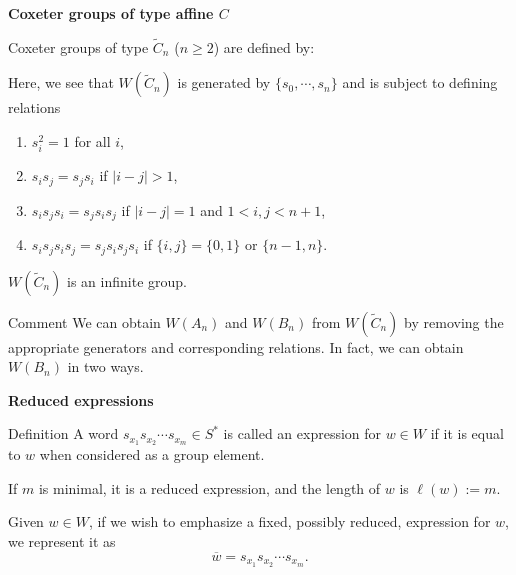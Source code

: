 \documentclass[9pt,handout]{beamer}
\newcommand{\w}{\overline{w}}
\newcommand{\C}{\widetilde{C}}
\begin{document}
\begin{frame}{\textbf{Coxeter groups of type affine $C$}}

Coxeter groups of type $\C_{n}$ ($n \geq 2$) are defined by:
\begin{figure}
\end{figure}

\pause 
Here, we see that $W(\C_{n})$ is generated by $\{s_{0}, 
\cdots, s_{n}\}$ and is subject to defining relations
\begin{enumerate}
\item $s_{i}^{2}=1$ for all $i$,
\item $s_{i}s_{j}=s_{j}s_{i}$ if $|i-j|>1$,
\item $s_{i}s_{j}s_{i}=s_{j}s_{i}s_{j}$ if $|i-j|=1$ and $1< i,j < n+1$, 
\item $s_{i}s_{j}s_{i}s_{j}=s_{j}s_{i}s_{j}s_{i}$ if $\{i,j\}=\{0,1\}$ or 
$\{n-1,n\}$.
\end{enumerate}
\pause 
\bigskip
$W(\C_{n})$ is an infinite group.

\pause

\begin{block}{Comment}
We can obtain $W(A_{n})$ and $W(B_{n})$ from $W(\C_{n})$ by removing the 
appropriate generators and corresponding relations.  In fact, 
we can obtain $W(B_{n})$ in two ways.
\end{block}

\end{frame}


\begin{frame}{\textbf{Reduced expressions}}

\begin{block}{Definition}
A word $s_{x_1}s_{x_2}\cdots s_{x_m}\in S^{*}$ is called an \alert
{expression} for $w\in W$ if it is equal to $w$ when considered as 
a group element.

\vspace{1em}
\pause

If $m$ is minimal, it is a \alert{reduced expression}, and the \alert
{length} of $w$ is $\ell(w):=m$.

\vspace{1em}
\pause

Given $w \in W$, if we wish to emphasize a fixed, possibly reduced, 
expression for $w$, we represent it as
\[
\w=s_{x_1}s_{x_2}\cdots s_{x_m}.
\]
\end{block}

\end{frame}
\end{document}
